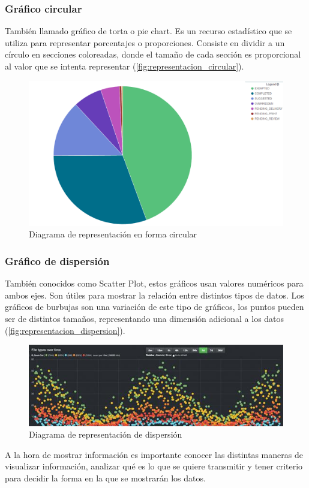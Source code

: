 \subsubsection*{Gráfico circular}
También llamado gráfico de torta o pie chart. Es un recurso estadístico que se utiliza para representar porcentajes o proporciones. Consiste en dividir a un círculo en secciones coloreadas, donde el tamaño de cada sección es proporcional al valor que se intenta representar (\autoref{fig:representacion_circular}).

\begin{figure}
  \includegraphics[width=\linewidth]{src/images/01-capitulo-1/representacion_circular.png}
  \caption{Diagrama de representación en forma circular}
  \label{fig:representacion_circular}
\end{figure}

\subsubsection*{Gráfico de dispersión}
También conocidos como Scatter Plot, estos gráficos usan valores numéricos para ambos ejes. Son útiles para mostrar la relación entre distintos tipos de datos. Los gráficos de burbujas son una variación de este tipo de gráficos, los puntos pueden ser de distintos tamaños, representando una dimensión adicional a los datos (\autoref{fig:representacion_dispersion}).

\begin{figure}
  \includegraphics[width=\linewidth]{src/images/01-capitulo-1/representacion_dispersion.jpg}
  \caption{Diagrama de representación de dispersión}
  \label{fig:representacion_dispersion}
\end{figure}

A la hora de mostrar información es importante conocer las distintas maneras de visualizar información, analizar qué es lo que se quiere transmitir y tener criterio para decidir la forma en la que se mostrarán los datos.
